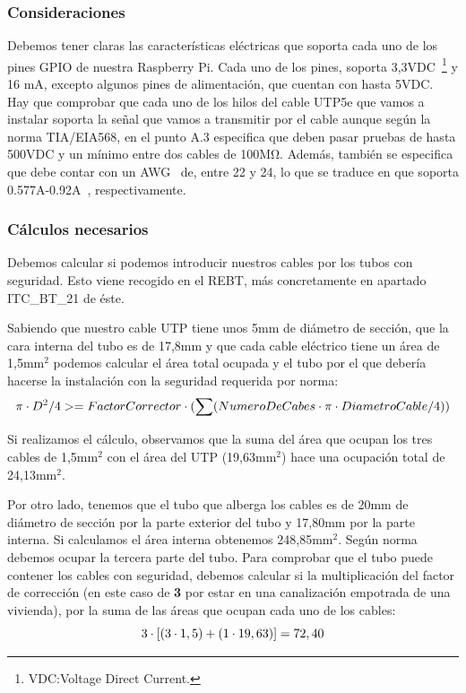 \subsubsection{Consideraciones}
Debemos tener claras las características eléctricas que soporta cada uno de los pines GPIO de nuestra Raspberry Pi. Cada uno de los pines, soporta 3,3VDC~\footnote{VDC:Voltage Direct Current.} y 16 mA, excepto algunos pines de alimentación, que cuentan con hasta 5VDC.
Hay que comprobar que cada uno de los hilos del cable UTP5e que vamos a instalar soporta la señal que vamos a transmitir por el cable aunque según la norma TIA/EIA568, en el punto A.3 especifica que deben pasar pruebas de hasta 500VDC y un mínimo entre dos cables de 100M\si{\ohm}. Además, también se especifica que debe contar con un AWG~\cite{wiki:DefAWG} de, entre 22 y 24, lo que se traduce en que soporta 0.577A-0.92A~\cite{wiki:TablaAWG}, respectivamente.

\subsubsection{Cálculos necesarios}
Debemos calcular si podemos introducir nuestros cables por los tubos con seguridad. Esto viene recogido en el REBT, más concretamente en apartado ITC\_BT\_21 de éste.

Sabiendo que nuestro cable UTP tiene unos 5mm de diámetro de sección, que la cara interna del tubo es de 17,8mm y que cada cable eléctrico tiene un área de 1,5mm$^{2}$ podemos calcular el área total ocupada y el tubo por el que debería hacerse la instalación con la seguridad requerida por norma:
\begin{equation}
\centering
\pi \cdot D^2/4 >= FactorCorrector \cdot (\sum(NumeroDeCabes \cdot \pi \cdot DiametroCable/4))
\end{equation}\label{E1}

Si realizamos el cálculo, observamos que la suma del área que ocupan los tres cables de 1,5mm$^{2}$ con el área del UTP (19,63mm$^{2}$) hace una ocupación total de 24,13mm$^{2}$.

Por otro lado, tenemos que el tubo que alberga los cables es de 20mm de diámetro de sección por la parte exterior del tubo y 17,80mm por la parte interna. Si calculamos el área interna obtenemos 248,85mm$^{2}$.
Según norma debemos ocupar la tercera parte del tubo. Para comprobar que el tubo puede contener los cables con seguridad, debemos calcular si la multiplicación del factor de corrección (en este caso de \textbf{3} por estar en una canalización empotrada de una vivienda), por la suma de las áreas que ocupan cada uno de los cables: 
\begin{equation}
\centering
3 \cdot [(3 \cdot 1,5)+(1 \cdot 19,63)]=72,40
\end{equation}\label{E2}

